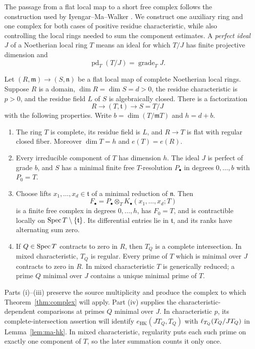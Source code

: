 The passage from a flat local map to a short free complex follows the
construction used by Iyengar--Ma--Walker
\cite[Proposition~8.3]{IMW2022}. We construct one auxiliary ring and one
complex for both cases of positive residue characteristic, while also
controlling the local rings needed to sum the component estimates. A
\emph{perfect ideal} $J$ of a Noetherian local ring $T$ means an ideal
for which $T/J$ has finite projective dimension and
\[
  \operatorname{pd}_T(T/J)=\operatorname{grade}_T J.
\]

\begin{proposition}\label{prop:setup}
Let $(R,\mathfrak m)\to(S,\mathfrak n)$ be a flat local map of complete
Noetherian local rings.  Suppose $R$ is a domain,
$\dim R=\dim S=d>0$, the residue characteristic is $p>0$, and the
residue field $L$ of $S$ is algebraically closed.  There is a factorization
\[
  R\longrightarrow (T,\mathfrak t)\longrightarrow S=T/J
\]
with the following properties.  Write
$b=\dim(T/\mathfrak mT)$ and $h=d+b$.
\begin{enumerate}
\item[(i)] The ring $T$ is complete, its residue field is $L$, and
      $R\to T$ is flat with regular closed fiber.  Moreover
      $\dim T=h$ and $e(T)=e(R)$.
\item[(ii)] Every irreducible component of $T$ has dimension $h$.
      The ideal $J$ is perfect of grade $b$, and $S$ has a minimal
      finite free $T$-resolution $P_\bullet$ in degrees $0,\ldots,b$
      with $P_0=T$.
\item[(iii)] Choose lifts $x_1,\ldots,x_d\in\mathfrak t$ of a minimal
      reduction of $\mathfrak n$.  Then
      \[
         F_\bullet=P_\bullet\otimes_T K_\bullet(x_1,\ldots,x_d;T)
      \]
      is a finite free complex in degrees $0,\ldots,h$, has $F_0=T$,
      and is contractible locally on
      $\operatorname{Spec} T\setminus\{\mathfrak t\}$.  Its differential entries
      lie in $\mathfrak t$, and its ranks have alternating sum zero.
\item[(iv)] If $Q\in\operatorname{Spec} T$ contracts to zero in $R$, then $T_Q$ is
      a complete intersection.  In mixed characteristic, $T_Q$ is
      regular.  Every prime of $T$ which is minimal over $J$ contracts
      to zero in $R$.  In mixed characteristic $T$ is generically
      reduced; a prime $Q$ minimal over $J$ contains a unique minimal
      prime of $T$.
\end{enumerate}
\end{proposition}

Parts (i)--(iii) preserve the source multiplicity and produce the complex
to which Theorem~\ref{thm:complex} will apply. Part (iv) supplies the
characteristic-dependent comparisons at primes $Q$ minimal over $J$.
In characteristic $p$, its complete-intersection assertion will identify
$e_{\mathrm{HK}}(JT_Q,T_Q)$ with $\operatorname{\ell}_{T_Q}(T_Q/JT_Q)$ in
Lemma~\ref{lem:ma-hk}. In mixed characteristic, regularity puts each
such prime on exactly one component of $T$, so the later summation
counts it only once.


